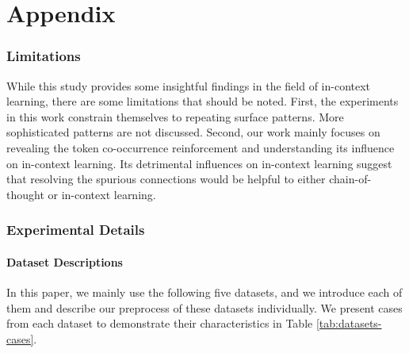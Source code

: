 \clearpage
{} %
\part{Appendix} %
\parttoc %

\section{Limitations}
While this study provides some insightful findings in the field of in-context learning, there are some limitations that should be noted.
First, the experiments in this work constrain themselves to repeating surface patterns. More sophisticated patterns are not discussed. 
Second, our work mainly focuses on revealing the token co-occurrence reinforcement and understanding its influence on in-context learning. Its detrimental influences on in-context learning suggest that resolving the spurious connections would be helpful to either chain-of-thought or in-context learning. 


\section{Experimental Details}
\label{sec:exp_detail}

\subsection{Dataset Descriptions}
\label{sec:datasets}
In this paper, we mainly use the following five datasets, and we introduce each of them and describe our preprocess of these datasets individually. 
We present cases from each dataset to demonstrate their characteristics in Table \ref{tab:datasets-cases}.

